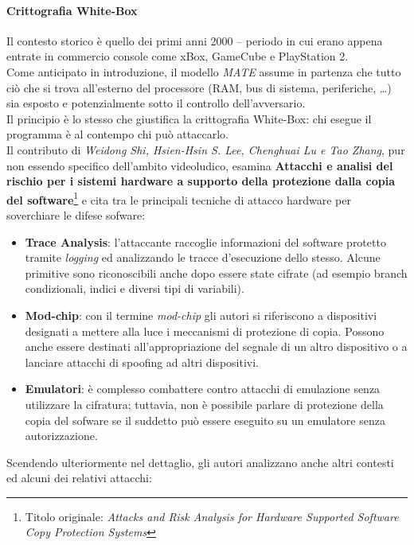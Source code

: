 \documentclass[a4paper,12pt]{article}
\begin{document}
\paragraph{Crittografia White-Box}
Il contesto storico è quello dei primi anni 2000 -- periodo in cui erano appena entrate in commercio console come xBox, GameCube e PlayStation 2. \\
Come anticipato in introduzione, il modello \textit{MATE} assume in partenza che tutto ciò che si trova all'esterno del processore (RAM, bus di sistema, periferiche, \ldots) sia esposto e potenzialmente sotto il controllo dell'avversario.\\
Il principio è lo stesso che giustifica la crittografia White-Box: chi esegue il programma è al contempo chi può attaccarlo. \\
Il contributo di \textit{Weidong Shi, Hsien-Hsin S. Lee, Chenghuai Lu e Tao Zhang}, pur non essendo specifico dell'ambito videoludico, esamina \textbf{Attacchi e analisi del rischio per i sistemi hardware a supporto della protezione dalla copia del software}\footnote{Titolo originale: \textit{Attacks and Risk Analysis for Hardware Supported
Software Copy Protection Systems}} e cita tra le principali tecniche di attacco hardware per soverchiare le difese sofware:
\begin{itemize}
    \item \textbf{Trace Analysis}: l'attaccante raccoglie informazioni del software protetto tramite \textit{logging} ed analizzando le tracce d'esecuzione dello stesso. Alcune primitive sono riconoscibili anche dopo essere state cifrate (ad esempio branch condizionali, indici e diversi tipi di variabili).
    \item \textbf{Mod-chip}: con il termine \textit{mod-chip} gli autori si riferiscono a dispositivi designati a mettere alla luce i meccanismi di protezione di copia. Possono anche essere destinati all'appropriazione del segnale di un altro dispositivo o a lanciare attacchi di spoofing ad altri dispositivi.
    \item \textbf{Emulatori}: è complesso combattere contro attacchi di emulazione senza utilizzare la cifratura; tuttavia, non è possibile parlare di protezione della copia del sofware se il suddetto può essere eseguito su un emulatore senza autorizzazione.
\end{itemize}
Scendendo ulteriormente nel dettaglio, gli autori analizzano anche altri contesti ed alcuni dei relativi attacchi:
\end{document}
